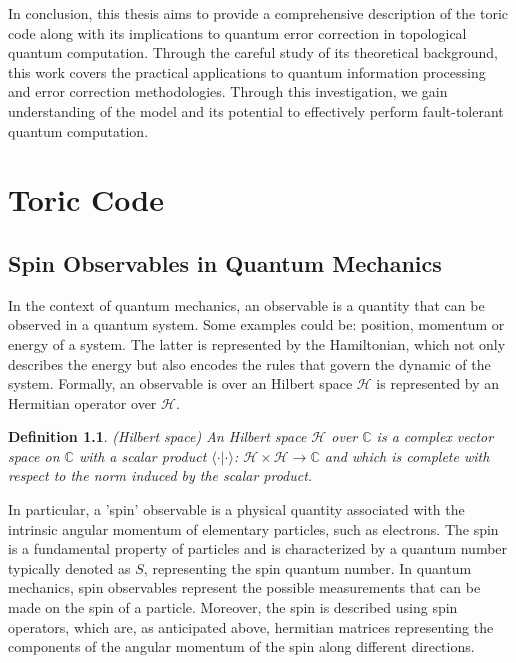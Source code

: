 \documentclass{Configuration_Files/PoliMi3i_thesis}
\newtheorem{definition}{Definition}[chapter]
\begin{document}
In conclusion, this thesis aims to provide a comprehensive description of the 
toric code along with its implications to quantum error correction in topological 
quantum computation. 
Through the careful study of its theoretical background, this work covers the
practical applications to quantum information processing and error 
correction methodologies. Through this investigation, we gain 
understanding of the model and its potential to effectively perform fault-tolerant 
quantum computation. \newline
















\chapter{Toric Code}
\label{ch:chapter_one}%


\section{Spin Observables in Quantum Mechanics}
\label{sec:Observables}

In the context of quantum mechanics, an observable is a quantity that can be observed in a quantum system. Some examples could be: position, momentum or energy of a system. The latter is represented by the Hamiltonian, which not only describes the energy but also encodes the rules that govern the dynamic of the system. 
Formally, an observable is over an Hilbert space $\mathscr{H}$ is represented by an Hermitian operator over $\mathscr{H}$.

\begin{definition} (Hilbert space)
	An Hilbert space $\mathscr{H}$ over $\mathbb{C}$ is a complex vector space on $\mathbb{C}$  
	with a scalar product $\langle \cdot \vert \cdot \rangle $: $\mathscr{H} \times \mathscr{H} \rightarrow \mathbb{C}$ and which is complete with respect to the norm induced by the scalar product.
\end{definition}

In particular, a 'spin' observable is a physical quantity associated with the intrinsic angular momentum of elementary particles, such as electrons. The spin is a fundamental property of particles and is characterized by a quantum number typically denoted as $S$, representing the spin quantum number.
In quantum mechanics, spin observables represent the possible measurements that can be made on the spin of a particle. Moreover, the spin is described using spin operators, which are, as anticipated above, hermitian matrices representing the components of the angular momentum of the spin along different directions. 
\end{document}
